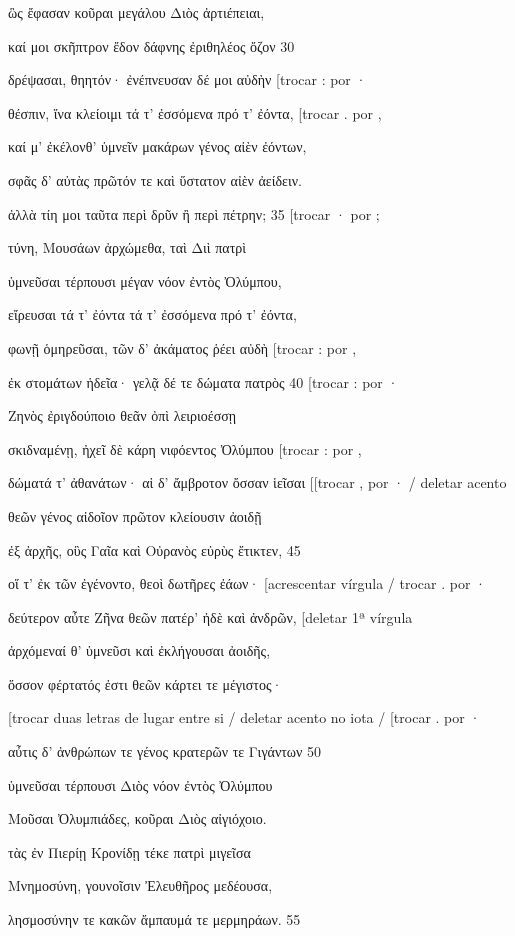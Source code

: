ὣς ἔφασαν κοῦραι μεγάλου Διὸς ἀρτιέπειαι,

καί μοι σκῆπτρον ἔδον δάφνης ἐριθηλέος ὄζον 30

δρέψασαι, θηητόν· ἐνέπνευσαν δέ μοι αὐδὴν {[}trocar : por ·

θέσπιν, ἵνα κλείοιμι τά τ' ἐσσόμενα πρό τ' ἐόντα, {[}trocar . por ,

καί μ' ἐκέλονθ' ὑμνεῖν μακάρων γένος αἰὲν ἐόντων,

σφᾶς δ' αὐτὰς πρῶτόν τε καὶ ὕστατον αἰὲν ἀείδειν.

ἀλλὰ τίη μοι ταῦτα περὶ δρῦν ἢ περὶ πέτρην; 35 {[}trocar · por ;

τύνη, Μουσάων ἀρχώμεθα, ταὶ Διὶ πατρὶ

ὑμνεῦσαι τέρπουσι μέγαν νόον ἐντὸς Ὀλύμπου,

εἴρευσαι τά τ' ἐόντα τά τ' ἐσσόμενα πρό τ' ἐόντα,

φωνῇ ὁμηρεῦσαι, τῶν δ' ἀκάματος ῥέει αὐδὴ {[}trocar : por ,

ἐκ στομάτων ἡδεῖα· γελᾷ δέ τε δώματα πατρὸς 40 {[}trocar : por ·

Ζηνὸς ἐριγδούποιο θεᾶν ὀπὶ λειριοέσσῃ

σκιδναμένῃ, ἠχεῖ δὲ κάρη νιφόεντος Ὀλύμπου {[}trocar : por ,

δώματά τ' ἀθανάτων· αἱ δ' ἄμβροτον ὄσσαν ἱεῖσαι {[}{[}trocar , por · /
deletar acento

θεῶν γένος αἰδοῖον πρῶτον κλείουσιν ἀοιδῇ

ἐξ ἀρχῆς, οὓς Γαῖα καὶ Οὐρανὸς εὐρὺς ἔτικτεν, 45

οἵ τ' ἐκ τῶν ἐγένοντο, θεοὶ δωτῆρες ἐάων· {[}acrescentar vírgula /
trocar . por ·

δεύτερον αὖτε Ζῆνα θεῶν πατέρ' ἠδὲ καὶ ἀνδρῶν, {[}deletar 1ª vírgula

ἀρχόμεναί θ' ὑμνεῦσι καὶ ἐκλήγουσαι ἀοιδῆς,

ὅσσον φέρτατός ἐστι θεῶν κάρτει τε μέγιστος·

{[}trocar duas letras de lugar entre si / deletar acento no iota /
{[}trocar . por ·

αὖτις δ' ἀνθρώπων τε γένος κρατερῶν τε Γιγάντων 50

ὑμνεῦσαι τέρπουσι Διὸς νόον ἐντὸς Ὀλύμπου

Μοῦσαι Ὀλυμπιάδες, κοῦραι Διὸς αἰγιόχοιο.

τὰς ἐν Πιερίῃ Κρονίδῃ τέκε πατρὶ μιγεῖσα

Μνημοσύνη, γουνοῖσιν Ἐλευθῆρος μεδέουσα,

λησμοσύνην τε κακῶν ἄμπαυμά τε μερμηράων. 55

